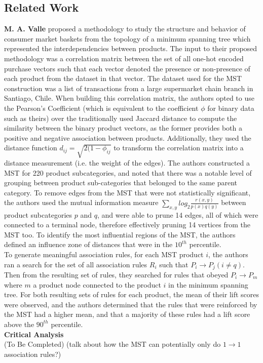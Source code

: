 \documentclass[a4paper,11pt]{article}
\begin{document}
\subsection{Related Work}
\label{related-work}
\textbf{M. A. Valle} \cite{mst_paper} proposed a methodology to study the structure and behavior of consumer market baskets from the topology of a minimum spanning tree which represented the interdependencies between products. The input to their proposed methodology was a correlation matrix between the set of all one-hot encoded purchase vectors such that each vector denoted the presence or non-presence of each product from the dataset in that vector.  The dataset used for the MST construction was a list of transactions from a large supermarket chain branch in Santiago, Chile.  When building this correlation matrix, the authors opted to use the Pearson's Coefficient (which is equivalent to the coefficient $\phi$ for binary data such as theirs) over the traditionally used Jaccard distance to compute the similarity between the binary product vectors, as the former provides both a positive and negative association between products. Additionally,  they used the distance function $d_{ij} = \sqrt{2(1-\phi_{ij}}$ to transform the correlation matrix into a distance measurement (i.e. the weight of the edges).  The authors constructed a MST for 220 product subcategories, and noted that there was a notable level of grouping between product sub-categories that belonged to the same parent category.  To remove edges from the MST that were not statistically significant,  the authors used the mutual information \cite{measure} measure $\sum\limits_{x,y}log_2 \frac{r(x,y)}{p(x)q(y)}$ between product subcategories $p$ and $q$, and were able to prune 14 edges, all of which were connected to a terminal node, therefore effectively pruning 14 vertices from the MST too. To identify the most influential regions of the MST, the authors defined an influence zone of distances that were in the $10^{th}$ percentile.
\\
To generate meaningful association rules,  for each MST product $i$, the authors ran a search for the set of all association rules $R_i$ such that $P_i \rightarrow P_j (i \neq q)$. Then from the resulting set of rules, they searched for rules that obeyed $P_i \rightarrow P_m$ where $m$ a product node connected to the product $i$ in the minimum spanning tree.  For both resulting sets of rules for each product, the mean of their lift scores were observed, and the authors determined that the rules that were reinforced by the MST had a higher mean, and that a majority of these rules had a lift score above the $90^{th}$ percentile. 
\\\textbf{Critical Analysis}\\
(To Be Completed) (talk about how the MST can potentially only do $1 \rightarrow 1$ association rules?)



\newpage
\printbibliography
\end{document}
